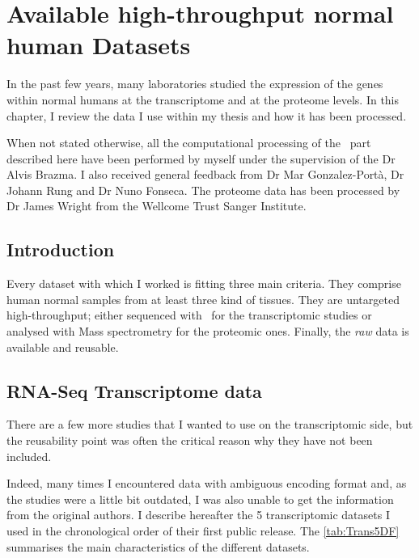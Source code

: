 \chapter{Available high-throughput normal human Datasets}
\label{ch:datasets}

\begin{comment}
\setlength{\epigraphwidth}{0.57\textwidth}
\setlength{\epigraphrule}{0.1pt}
\epigraph{Data! Data! Data! I can’t make bricks without clay!}{Sherlock Homes
    (Sir Arthur Conan Doyle)}
\end{comment}

In the past few years, many laboratories studied the expression
of the genes within normal humans at the transcriptome and at
the proteome levels. In this chapter, I review the data I use within my thesis
and how it has been processed.

When not stated otherwise, all the computational processing of the \Rnaseq\ part
described here have been performed by myself under the supervision of
the Dr Alvis Brazma. I also received general feedback from Dr Mar Gonzalez-Portà,
Dr Johann Rung and Dr Nuno Fonseca. The proteome data has been processed by
Dr James Wright from the Wellcome Trust Sanger Institute.


\section{Introduction}

Every dataset with which I worked is fitting three main criteria.
They comprise human normal samples from at least three kind of tissues.
They are untargeted high-throughput; either sequenced with \Rnaseq\
for the transcriptomic studies or
analysed with Mass spectrometry for the proteomic ones.
Finally, the \emph{raw} data is available and reusable.


\section{RNA-Seq Transcriptome data}

There are a few more studies that I wanted to use on the
transcriptomic side, but the reusability point was often the critical reason
why they have not been included.

Indeed, many times I encountered data with ambiguous encoding format
and, as the studies were a little bit outdated,
I was also unable to get the information from the original authors.
I describe hereafter the 5 transcriptomic datasets I used
in the chronological order of their first public release.
The \cref{tab:Trans5DF} summarises the main characteristics of the different
datasets.

